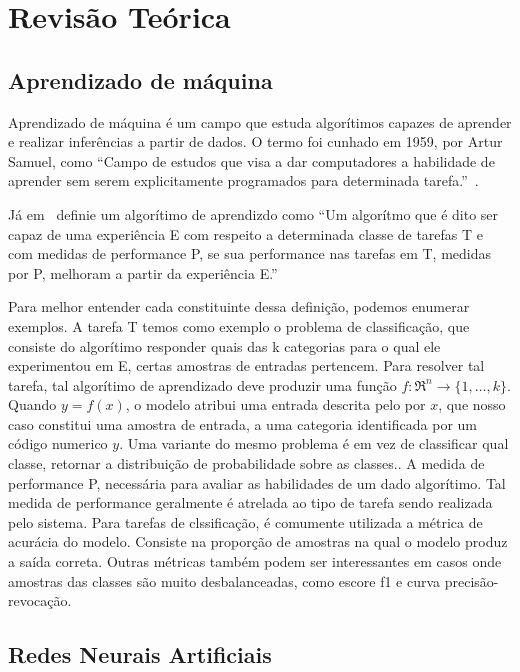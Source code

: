 \section{Revisão Teórica}\label{sec:Cap2_revisao_teorica}

\subsection{Aprendizado de máquina}\label{sec:aprendizado_maquina}

Aprendizado de máquina é um campo que estuda algorítimos capazes de aprender e realizar inferências a partir de dados. O termo foi cunhado em 1959, por Artur Samuel, como “Campo de estudos que visa a dar computadores a habilidade de aprender sem serem explicitamente programados para determinada tarefa.”~\cite{Samuel1959SomeSI}.

Já em~\cite{Mitchell97} definie um algorítimo de aprendizdo como “Um algorítmo que é dito ser capaz de uma experiência E com respeito a determinada classe de tarefas T e com medidas de performance P, se sua performance nas tarefas em T, medidas por P, melhoram a partir da experiência E.”

Para melhor entender cada constituinte dessa definição, podemos enumerar exemplos. A
tarefa T temos como exemplo o problema de classificação, que consiste do algorítimo
responder quais das k categorias para o qual ele experimentou em E, certas amostras de entradas pertencem. Para resolver tal tarefa, tal algorítimo de aprendizado deve produzir uma função $f:\Re^n\rightarrow \{1,\ldots,k\}$. Quando $y=f(x)$, o modelo atribui uma entrada descrita pelo por $x$, que nosso caso constitui uma amostra de entrada, a uma categoria identificada por um código numerico $y$. Uma variante do mesmo problema é em vez de classificar qual classe, retornar a distribuição de probabilidade sobre as classes.\cite{GoodBengCour16}. A medida de performance P, necessária para avaliar as habilidades de um dado algorítimo. Tal medida de performance geralmente é atrelada ao tipo de tarefa sendo realizada pelo sistema. Para tarefas de clssificação, é comumente utilizada a métrica de acurácia do modelo. Consiste na proporção de amostras na qual o modelo produz a saída correta. Outras métricas também podem ser interessantes em casos onde amostras das classes são muito desbalanceadas, como escore f1 e curva precisão-revocação.




\subsection{Redes Neurais Artificiais}\label{sec:Cap2_redes_neurais}

